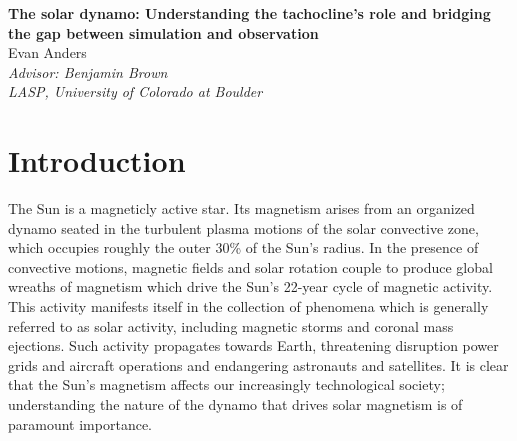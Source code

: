 \documentclass[aasms,12pt]{article}
\begin{document}
\begin{center}
   \large\textbf{The solar dynamo: Understanding the tachocline's role and bridging
	the gap between simulation and observation}\\
   \vspace{0.4cm}
   \large{Evan Anders}\\
   \vspace{0.4cm}
   \normalsize\textit{Advisor: Benjamin Brown}\\
   \normalsize\textit{LASP, University of Colorado at Boulder}\\
\end{center}






\section{Introduction}
The Sun is a magneticly active star.  Its magnetism arises from an 
organized dynamo seated in the turbulent plasma
motions of the solar convective zone, which occupies roughly the outer 30\%
of the Sun's radius.  In the presence of
convective motions, magnetic fields and solar rotation couple to produce global
wreaths of magnetism which drive the Sun's 22-year cycle of magnetic activity.
This activity manifests itself in the collection of phenomena which is generally
referred to as solar activity, including magnetic storms and coronal mass
ejections.  Such activity propagates towards Earth, threatening disruption power
grids and aircraft operations and endangering astronauts and satellites.  It is
clear that the Sun's magnetism affects our increasingly technological society;
understanding the nature of the dynamo that drives solar magnetism is of
paramount importance.
\end{document}
